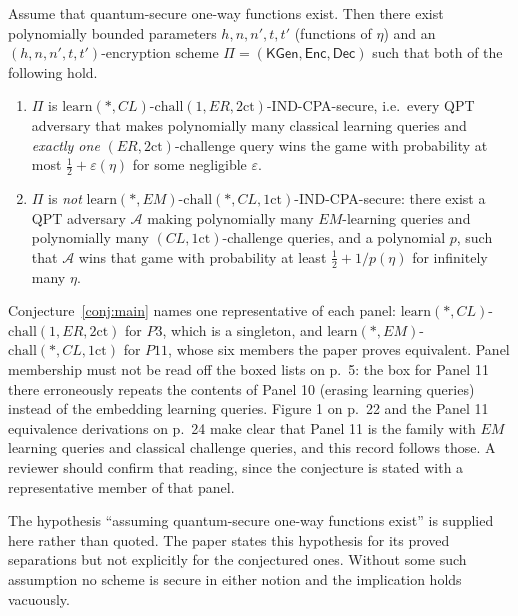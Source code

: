 \documentclass{aicr-conjecture}
\newcommand{\KGen}{\mathsf{KGen}}
\newcommand{\Enc}{\mathsf{Enc}}
\newcommand{\Dec}{\mathsf{Dec}}
\newcommand{\onect}{1\mathrm{ct}}
\newcommand{\twoct}{2\mathrm{ct}}
\newcommand{\learn}{\mathrm{learn}}
\newcommand{\chall}{\mathrm{chall}}
\newcommand{\NErOne}{\ensuremath{\learn(*,CL)}-\ensuremath{\chall(1,ER,\twoct)}}
\newcommand{\NEmMany}{\ensuremath{\learn(*,EM)}-\ensuremath{\chall(*,CL,\onect)}}
\begin{document}
\begin{conjecture}\label{conj:main}
Assume that quantum-secure one-way functions exist. Then there exist
polynomially bounded parameters $h,n,n',t,t'$ (functions of $\eta$) and
an $(h,n,n',t,t')$-encryption scheme $\Pi=(\KGen,\Enc,\Dec)$ such that
both of the following hold.
\begin{enumerate}
  \item $\Pi$ is \NErOne-IND-CPA-secure, i.e.\ every QPT adversary that
    makes polynomially many classical learning queries and \emph{exactly
    one} $(ER,\twoct)$-challenge query wins the game with probability at
    most $\tfrac12+\varepsilon(\eta)$ for some negligible $\varepsilon$.
  \item $\Pi$ is \emph{not} \NEmMany-IND-CPA-secure: there exist a QPT
    adversary $\mathcal{A}$ making polynomially many $EM$-learning
    queries and polynomially many $(CL,\onect)$-challenge queries, and a
    polynomial $p$, such that $\mathcal{A}$ wins that game with
    probability at least $\tfrac12+1/p(\eta)$ for infinitely many
    $\eta$.
\end{enumerate}
\end{conjecture}

\begin{remark}\label{rem:panels}
Conjecture~\ref{conj:main} names one representative of each panel:
\NErOne{} for $P3$, which is a singleton, and \NEmMany{} for $P11$,
whose six members the paper proves equivalent. Panel membership must not
be read off the boxed lists on p.~5: the box for Panel 11 there
erroneously repeats the contents of Panel 10 (erasing learning queries)
instead of the embedding learning queries. Figure 1 on p.~22 and the
Panel 11 equivalence derivations on p.~24 make clear that Panel 11 is
the family with $EM$ learning queries and classical challenge queries,
and this record follows those. A reviewer should confirm that reading,
since the conjecture is stated with a representative member of that
panel.
\end{remark}

\begin{remark}\label{rem:owf}
The hypothesis ``assuming quantum-secure one-way functions exist'' is
supplied here rather than quoted. The paper states this hypothesis for
its proved separations but not explicitly for the conjectured ones.
Without some such assumption no scheme is secure in either notion and
the implication holds vacuously.
\end{remark}
\end{document}
